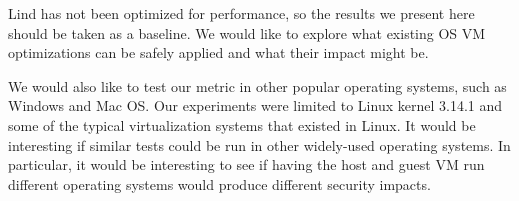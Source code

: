 Lind has not been optimized for performance, so the results we present here should be taken as a baseline.
We would like to explore what existing OS VM optimizations can be safely applied
and what their impact might be.

We would also like to test our metric in other popular operating systems, such as Windows and Mac OS. 
Our experiments were limited to Linux kernel 3.14.1 and some of the typical virtualization systems that existed in Linux. 
It would be interesting
if similar tests could be run in other widely-used operating systems. In particular, it would be interesting to see if 
having the host and guest VM run different operating systems would produce different security impacts. 